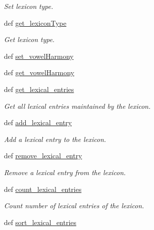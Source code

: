 \begin{DoxyCompactItemize}
\begin{DoxyCompactList}\small\item\em Set lexicon type. \end{DoxyCompactList}\item 
def \hyperlink{classlmf_1_1src_1_1core_1_1lexicon_1_1_lexicon_a86af37677fcdccbe00c1dc1ba19e0dbb}{get\+\_\+lexicon\+Type}
\begin{DoxyCompactList}\small\item\em Get lexicon type. \end{DoxyCompactList}\item 
def \hyperlink{classlmf_1_1src_1_1core_1_1lexicon_1_1_lexicon_af8b24fc50070179d1abf29f03559ddcc}{set\+\_\+vowel\+Harmony}
\item 
def \hyperlink{classlmf_1_1src_1_1core_1_1lexicon_1_1_lexicon_ab9647a29884f0d53a93842d4627cf64d}{get\+\_\+vowel\+Harmony}
\item 
def \hyperlink{classlmf_1_1src_1_1core_1_1lexicon_1_1_lexicon_a148e94a7d0a744b510ee81e53c51e0b0}{get\+\_\+lexical\+\_\+entries}
\begin{DoxyCompactList}\small\item\em Get all lexical entries maintained by the lexicon. \end{DoxyCompactList}\item 
def \hyperlink{classlmf_1_1src_1_1core_1_1lexicon_1_1_lexicon_aaa470820fbda4be04d6fe9139e761773}{add\+\_\+lexical\+\_\+entry}
\begin{DoxyCompactList}\small\item\em Add a lexical entry to the lexicon. \end{DoxyCompactList}\item 
def \hyperlink{classlmf_1_1src_1_1core_1_1lexicon_1_1_lexicon_a36f348d30a1193d216ac7dacd5f085be}{remove\+\_\+lexical\+\_\+entry}
\begin{DoxyCompactList}\small\item\em Remove a lexical entry from the lexicon. \end{DoxyCompactList}\item 
def \hyperlink{classlmf_1_1src_1_1core_1_1lexicon_1_1_lexicon_a0e5b3626dcbdbf4ccfda39be46b9e09f}{count\+\_\+lexical\+\_\+entries}
\begin{DoxyCompactList}\small\item\em Count number of lexical entries of the lexicon. \end{DoxyCompactList}\item 
def \hyperlink{classlmf_1_1src_1_1core_1_1lexicon_1_1_lexicon_a934a9edcae2b33eb5e7b9ce61cd0234a}{sort\+\_\+lexical\+\_\+entries}

\end{DoxyCompactItemize}

